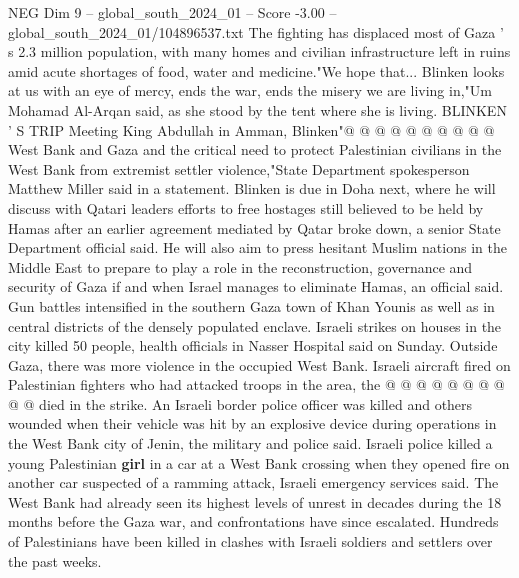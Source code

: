 \begin{textsample}{NEG Dim 9 – global\_south\_2024\_01 – Score -3.00 – global\_south\_2024\_01/104896537.txt}
The fighting has displaced most of Gaza ' s 2.3 million population, with many homes and civilian infrastructure left in ruins amid acute shortages of food, water and medicine."We hope that...
Blinken looks at us with an eye of mercy, ends the war, ends the misery we are living in,"Um Mohamad Al-Arqan said, as she stood by the tent where she is living.
BLINKEN ' S TRIP Meeting King Abdullah in Amman, Blinken"@ @ @ @ @ @ @ @ @ @ West Bank and Gaza and the critical need to protect Palestinian civilians in the West Bank from extremist settler violence,"State Department spokesperson Matthew Miller said in a statement.
Blinken is due in Doha next, where he will discuss with Qatari leaders efforts to free hostages still believed to be held by Hamas after an earlier agreement mediated by Qatar broke down, a senior State Department official said.
He will also aim to press hesitant Muslim nations in the Middle East to prepare to play a role in the reconstruction, governance and security of Gaza if and when Israel manages to eliminate Hamas, an official said.
Gun battles intensified in the southern Gaza town of Khan Younis as well as in central districts of the densely populated enclave.
Israeli strikes on houses in the city killed 50 people, health officials in Nasser Hospital said on Sunday.
Outside Gaza, there was more violence in the occupied West Bank.
Israeli aircraft fired on Palestinian fighters who had attacked troops in the area, the @ @ @ @ @ @ @ @ @ @ died in the strike.
An Israeli border police officer was killed and others wounded when their vehicle was hit by an explosive device during operations in the West Bank city of Jenin, the military and police said.
Israeli police killed a young Palestinian \textbf{girl} in a car at a West Bank crossing when they opened fire on another car suspected of a ramming attack, Israeli emergency services said.
The West Bank had already seen its highest levels of unrest in decades during the 18 months before the Gaza war, and confrontations have since escalated.
Hundreds of Palestinians have been killed in clashes with Israeli soldiers and settlers over the past weeks.

\end{textsample}
